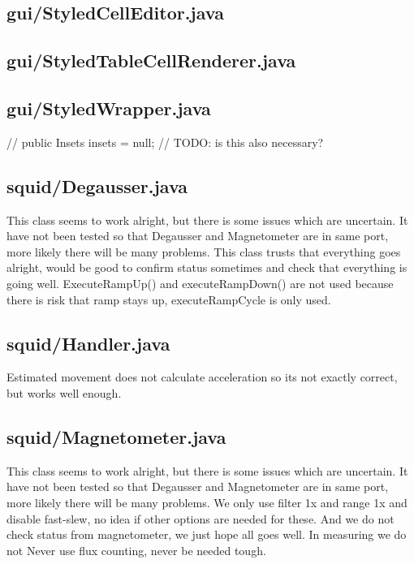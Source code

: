 \subsection{gui/StyledCellEditor.java}

\subsection{gui/StyledTableCellRenderer.java}

\subsection{gui/StyledWrapper.java}
//        public Insets insets = null; // TODO: is this also necessary?

\subsection{squid/Degausser.java}

This class seems to work alright, but there is some issues which are uncertain. It have not been tested so that Degausser and Magnetometer are in same port, more likely there will be many problems. This class trusts that everything goes alright, would be good to confirm status sometimes and check that everything is going well. ExecuteRampUp() and executeRampDown() are not used because there is risk that ramp stays up, executeRampCycle is only used.

\subsection{squid/Handler.java}

Estimated movement does not calculate acceleration so its not exactly correct, but works well enough.

\subsection{squid/Magnetometer.java}

This class seems to work alright, but there is some issues which are uncertain. It have not been tested so that Degausser and Magnetometer are in same port, more likely there will be many problems. We only use filter 1x and range 1x and disable fast-slew, no idea if other options are needed for these. And we do not check status from magnetometer, we just hope all goes well. In measuring we do not Never use flux counting, never be needed tough.


